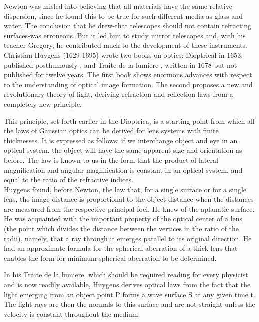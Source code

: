             Newton was misled into believing that all materials have the same relative dispersion, since he found this to be true for such different media as glass and water. The conclusion that he drew-that telescopes should not contain refracting surfaces-was erroneous. But it led him to study mirror telescopes and, with his teacher Gregory, he contributed much to the development of these instruments.\\

            Christian Huygens (1629-1695) wrote two books on optics: Dioptrical in 1653, published posthumously , and Traite de la lumiere , written in 1678 but not published for twelve years. The first book shows enormous advances with respect to the understanding of optical image formation. The second proposes a new and revolutionary theory of light, deriving refraction and reflection laws from a completely new principle.
            
            This principle, set forth earlier in the Dioptrica, is a starting point from which all the laws of Gaussian optics can be derived for lens systems with finite thicknesses. It is expressed as follows: if we interchange object and eye in an optical system, the object will have the same apparent size and orientation as before. The law is known to us in the form that the product of lateral magnification and angular magnification is constant in an optical system, and equal to the ratio of the refractive indices.\\
            
            Huygens found, before Newton, the law that, for a single surface or for a single lens, the image distance is proportional to the object distance when the distances are measured from the respective principal foci. He knew of the aplanatic surface. He was acquainted with the important property of the optical center of a lens (the point which divides the distance between the vertices in the ratio of the radii), namely, that a ray through it emerges parallel to its original direction. He had an approximate formula for the spherical aberration of a thick lens that enables the form for minimum spherical aberration to be determined.

            In his Traite de la lumiere, which should be required reading for every physicist and is now readily available, Huygens derives optical laws from the fact that the light emerging from an object point P forms a wave surface S at any given time t. The light rays are then the normals to this surface and are not straight unless the velocity is constant throughout the medium.\\

